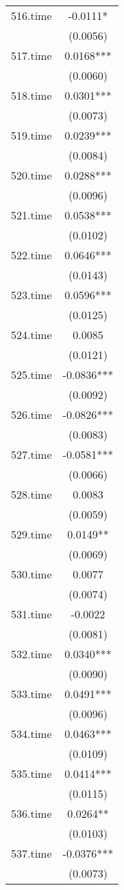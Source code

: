 \documentclass[]{article}
\begin{document}
\begin{tabular}{lc}
516.time & -0.0111* \\
 & (0.0056) \\
517.time & 0.0168*** \\
 & (0.0060) \\
518.time & 0.0301*** \\
 & (0.0073) \\
519.time & 0.0239*** \\
 & (0.0084) \\
520.time & 0.0288*** \\
 & (0.0096) \\
521.time & 0.0538*** \\
 & (0.0102) \\
522.time & 0.0646*** \\
 & (0.0143) \\
523.time & 0.0596*** \\
 & (0.0125) \\
524.time & 0.0085 \\
 & (0.0121) \\
525.time & -0.0836*** \\
 & (0.0092) \\
526.time & -0.0826*** \\
 & (0.0083) \\
527.time & -0.0581*** \\
 & (0.0066) \\
528.time & 0.0083 \\
 & (0.0059) \\
529.time & 0.0149** \\
 & (0.0069) \\
530.time & 0.0077 \\
 & (0.0074) \\
531.time & -0.0022 \\
 & (0.0081) \\
532.time & 0.0340*** \\
 & (0.0090) \\
533.time & 0.0491*** \\
 & (0.0096) \\
534.time & 0.0463*** \\
 & (0.0109) \\
535.time & 0.0414*** \\
 & (0.0115) \\
536.time & 0.0264** \\
 & (0.0103) \\
537.time & -0.0376*** \\
 & (0.0073) \\

\end{tabular}
\end{document}

